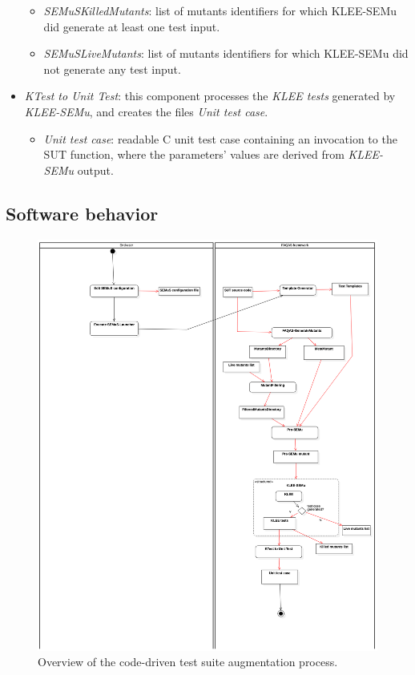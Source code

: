 \begin{itemize}
\begin{itemize}
    \item \emph{SEMuSKilledMutants}: list of mutants identifiers for which KLEE-SEMu did generate at least one test input.
    \item \emph{SEMuSLiveMutants}: list of mutants identifiers for which KLEE-SEMu did not generate any test input.
  \end{itemize}
  \item \emph{KTest to Unit Test}: this component processes the \emph{KLEE tests} generated by \emph{KLEE-SEMu}, and creates the files \emph{Unit test case}.
  \begin{itemize}
    \item \emph{Unit test case}: readable C unit test case containing an invocation to the SUT function, where the parameters' values are derived from \emph{KLEE-SEMu} output.
  \end{itemize}
\end{itemize}


\subsection{Software behavior}



\begin{figure}[tb]
  \centering
  \includegraphics[width=\textwidth]{images/semus-activity.pdf}
      \caption{Overview of the code-driven test suite augmentation process.}
      \label{fig:process:codeDriven:augmentation}
\end{figure}


